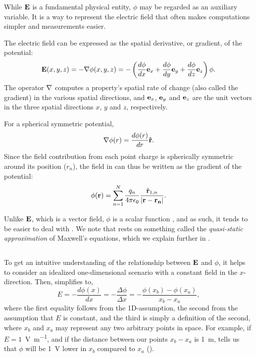 While ${\bf E}$ is a fundamental physical entity, $\phi$ may be regarded as an auxiliary variable. It is a way to represent the electric field that often makes computations simpler and measurements easier. 

The electric field can be expressed as the spatial derivative, or gradient, of the potential:
\begin{equation}
{\bf E}(x,y,z) = - {\bf \nabla} \phi(x,y,z) = - \left(\frac{d\phi}{dx} {\bf e}_x  + \frac{d\phi}{dy} {\bf e}_y + \frac{d\phi}{dz} {\bf e}_z \right) \phi.
\label{eq:Basics:EV}
\end{equation}
The operator ${\bf \nabla}$ computes a property's spatial rate of change (also called the gradient) in the various spatial directions, and ${\bf e}_x$, ${\bf e}_y$ and  ${\bf e}_z$ are the unit vectors in the three spatial directions $x$, $y$ and $z$, respectively. 

For a spherical symmetric potential, 
\begin{equation}
{\bf \nabla} \phi(r) = \frac{d\phi(r)}{dr} {\bf \hat{r}}.
\label{eq:Basics:SphericalNablaPhi}
\end{equation}
Since the field contribution from each point charge is spherically symmetric around its position ($r_n$), the field in  can thus be written as the gradient of the potential: 
\begin{equation}
{\phi}({\bf r}) = \sum_{n=1}^{N}  \frac{q_n}{4\pi \epsilon_0} \frac{\hat{{\bf r}}_{1,n}}{|{\bf r}-{\bf r_n}|}.
\label{eq:Basics:CoulombPhiN}
\end{equation}

Unlike ${\bf E}$, which is a vector field, $\phi$ is a scalar function , and as such, it tends to be easier to deal with . We note that  rests on something called the \textit{quasi-static approximation} of Maxwell's equations, which we explain further in . 


\subsection{}
\label{sec:Basics:Ground} 
To get an intuitive understanding of the relationship between ${\bf E}$ and $\phi$, it helps to consider an idealized one-dimensional scenario with a constant field in the $x$-direction. Then,  simplifies to,
\begin{equation}
E = -\frac{d\phi(x)}{dx} = -\frac{\Delta \phi}{\Delta x} = -\frac{\phi(x_b)-\phi(x_a)}{x_b-x_a},
\label{eq:Basics:EV1D}
\end{equation}
where the first equality follows from the 1D-assumption, the second from the assumption that $E$ is constant, and the third is simply a definition of the second, where $x_b$ and $x_a$ may represent any two arbitrary points in space. For example, if $E = 1$~\si{\volt\per\metre}, and if the distance between our points $x_b-x_a$ is 1~\si{\metre},  tells us that $\phi$ will be 1~\si{\volt} lower in $x_b$ compared to $x_a$ ().

